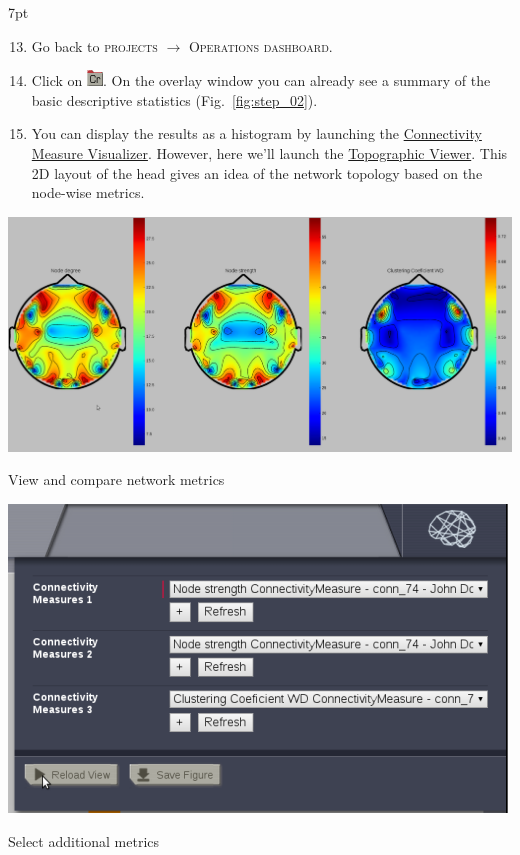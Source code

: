 \documentclass{tufte-handout}
\newenvironment{formal}{%
  \def\FrameCommand{%
    \hspace{1pt}%
    {\color{DarkBlue}\vrule width 2pt}%
    {\color{formalshade}\vrule width 4pt}%
    \colorbox{formalshade}%
  }%
  \MakeFramed{\advance\hsize-\width\FrameRestore}%
  \noindent\hspace{-4.55pt}%
  \begin{adjustwidth}{}{7pt}%
  \vspace{2pt}\vspace{2pt}%
}
{%
  \vspace{2pt}\end{adjustwidth}\endMakeFramed%
}
\begin{document}
\begin{formal}
  \begin{enumerate}[resume]
  \setcounter{enumi}{12}
  \item Go back to \textsc{projects} $\rightarrow$ \textsc{Operations dashboard}.
  \item Click on \includegraphics[width=0.042\linewidth]{nodeConnectivityMeasure}. On
  the overlay window you can already see a summary of the basic descriptive
  statistics (Fig.~\ref{fig:step_02}).
  \item You can display the results as a histogram by launching the \underline{Connectivity Measure Visualizer}. However, here we'll launch the \underline{Topographic Viewer}. This 2D layout of the
head gives an idea of the network topology based on the node-wise
metrics. 
  \end{enumerate}
\end{formal}


\newpage

\begin{marginfigure}
  \includegraphics[width=\linewidth]{Handout_UI_ModellingStructuralLesions_AnalysisResultCompare}%
  \caption{View and compare network metrics}%
  \label{fig:step_05b}%
\end{marginfigure}
\begin{marginfigure}
  \includegraphics[width=\linewidth]{Handout_UI_ModellingStructuralLesions_AnalysisView}%
  \caption{Select additional metrics}%
  \label{fig:step_05}%
\end{marginfigure}
\end{document}
